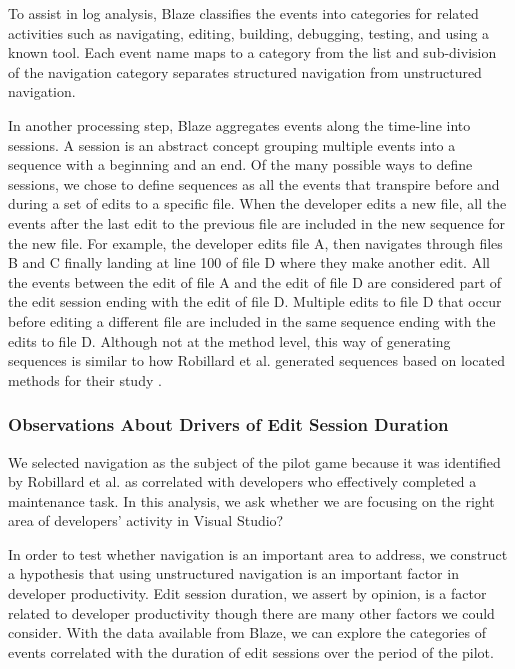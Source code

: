 \documentclass{sig-alternate}
\begin{document}
To assist in log analysis, Blaze classifies the events into categories for related activities such as navigating, editing, building, debugging,  testing, and using a  known tool.  Each event name maps to a category from the list and sub-division of the navigation category separates structured navigation from unstructured navigation.

In another processing step, Blaze aggregates events along the time-line into sessions.  A session is an abstract concept grouping multiple events into a sequence with a beginning and an end.  Of the many possible ways to define sessions, we chose to define sequences as all the events that transpire before and during a set of edits to a specific file.  When the developer edits a new file, all the events after the last edit to the previous file are included in the new sequence for the new file.  For example, the developer edits file A, then navigates through files B and C finally landing at line 100 of file D where they make another edit.  All the events between the edit of file A and the edit of file D are considered part of the edit session ending with the edit of file D.  Multiple edits to file D that occur before editing a different file are included in the same sequence ending with the edits to file D.  Although not at the method level, this way of generating sequences is similar to how Robillard et al. generated sequences based on located methods for their study \cite{wbsnipes:Robillard2004How}.

\subsubsection{Observations About Drivers of Edit Session Duration}

We selected navigation as the subject of the pilot game because it was identified by Robillard et al.\cite{wbsnipes:Robillard2004How} as correlated with developers who effectively completed a maintenance task.    In this analysis, we ask whether we are focusing on the right area of developers' activity in Visual Studio?

In order to test whether navigation is an important area to address, we construct a hypothesis that using unstructured navigation is an important factor in developer productivity.  Edit session duration, we assert by opinion, is a factor related to developer productivity though there are many other factors we could consider.  With the data available from Blaze, we can explore the categories of events correlated with the duration of edit sessions over the period of the pilot.  
\end{document}
